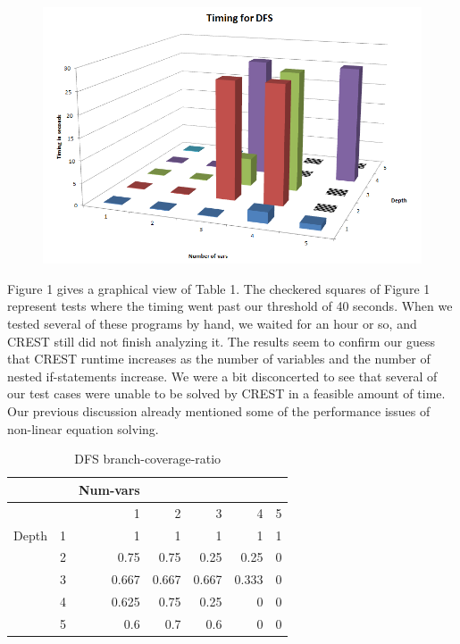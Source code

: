 \documentclass[oribibl]{llncs}
\begin{document}
\begin{figure}[!t]
\centering
\includegraphics[width=13cm]{dfs_timings}
\caption{}
\label{figure:motivation}
\end{figure}

Figure 1 gives a graphical view of Table 1. The checkered squares of Figure 1 represent tests where the timing went past our threshold of 40 seconds. When we tested several of these programs by hand, we waited for an hour or so, and CREST still did not finish analyzing it. The results seem to confirm our guess that CREST runtime increases as the number of variables and the number of nested if-statements increase. We were a bit disconcerted to see that several of our test cases were unable to be solved by CREST in a feasible amount of time. Our previous discussion already mentioned some of the performance issues of non-linear equation solving.

\begin{table}[htbp]
\caption{DFS branch-coverage-ratio}
\begin{tabular}{|l|r|r|r|r|r|r|}
\hline
 & \multicolumn{1}{l|}{} & \multicolumn{1}{l|}{Num-vars} & \multicolumn{1}{l|}{} & \multicolumn{1}{l|}{} & \multicolumn{1}{l|}{} & \multicolumn{1}{l|}{} \\ \hline
 & \multicolumn{1}{l|}{} & 1 & 2 & 3 & 4 & 5 \\ \hline
Depth & 1 & 1 & 1 & 1 & 1 & 1 \\ \hline
 & 2 & 0.75 & 0.75 & 0.25 & 0.25 & 0 \\ \hline
 & 3 & 0.667 & 0.667 & 0.667 & 0.333 & 0 \\ \hline
 & 4 & 0.625 & 0.75 & 0.25 & 0 & 0 \\ \hline
 & 5 & 0.6 & 0.7 & 0.6 & 0 & 0 \\ \hline
\end{tabular}
\label{DFS branch-coverage-ratio}
\end{table}
\end{document}
